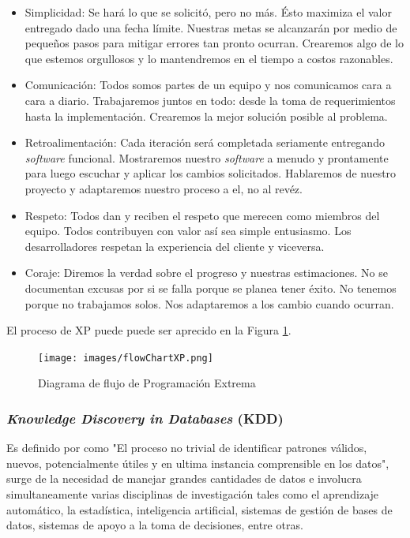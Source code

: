 \begin{itemize}
\item Simplicidad: Se hará lo que se solicitó, pero no más. Ésto maximiza el valor entregado dado una fecha límite. Nuestras metas se alcanzarán por medio de pequeños pasos para mitigar errores tan pronto ocurran. Crearemos algo de lo que estemos orgullosos y lo mantendremos en el tiempo a costos razonables.
\item Comunicación: Todos somos partes de un equipo y nos comunicamos cara a cara a diario. Trabajaremos juntos en todo: desde la toma de requerimientos hasta la implementación. Crearemos la mejor solución posible al problema.
\item Retroalimentación: Cada iteración será completada seriamente entregando \textit{software} funcional. Mostraremos nuestro \textit{software} a menudo y prontamente para luego escuchar y aplicar los cambios solicitados. Hablaremos de nuestro proyecto y adaptaremos nuestro proceso a el, no al revéz.
\item Respeto: Todos dan y reciben el respeto que merecen como miembros del equipo. Todos contribuyen con valor así sea simple entusiasmo. Los desarrolladores respetan la experiencia del cliente y viceversa. 
\item Coraje: Diremos la verdad sobre el progreso y nuestras estimaciones. No se documentan excusas por si se falla porque se planea tener éxito. No tenemos porque no trabajamos solos. Nos adaptaremos a los cambio cuando ocurran.
\end{itemize}

El proceso de XP puede puede ser aprecido en la Figura \ref{fig:procesoXP}.

\begin{figure}[H]
	\centering
	\captionsetup{justification=centering}
	\texttt{[image: images/flowChartXP.png]}
	\caption[Diagrama de flujo de Programación Extrema.]{Diagrama de flujo de Programación Extrema}
	\label{fig:procesoXP}
\end{figure}

\subsubsection{\textit{Knowledge Discovery in Databases} (KDD)}
\label{subsubsec:kdd}

Es definido por \cite{KDDFayyad} como "El proceso no trivial de identificar patrones válidos, nuevos, potencialmente útiles y en ultima instancia comprensible en los datos", surge de la necesidad de manejar grandes cantidades de datos e involucra simultaneamente varias disciplinas de investigación tales como el aprendizaje automático, la estadística, inteligencia artificial, sistemas de gestión de bases de datos, sistemas de apoyo a la toma de decisiones, entre otras.


